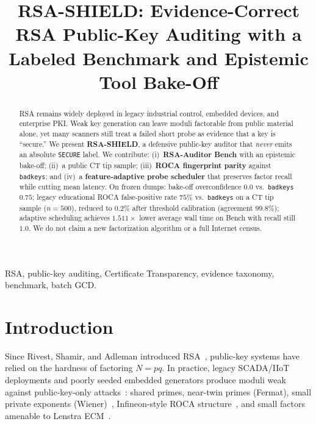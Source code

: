 \documentclass[conference]{IEEEtran}
\begin{document}
\title{RSA-SHIELD: Evidence-Correct RSA Public-Key Auditing with a Labeled Benchmark and Epistemic Tool Bake-Off}

\author{
}

\maketitle

\begin{abstract}
RSA remains widely deployed in legacy industrial control, embedded devices, and enterprise PKI. Weak key generation can leave moduli factorable from public material alone, yet many scanners still treat a failed short probe as evidence that a key is ``secure.'' We present \textbf{RSA-SHIELD}, a defensive public-key auditor that \emph{never} emits an absolute \texttt{SECURE} label. We contribute: (i)~\textbf{RSA-Auditor Bench} with an epistemic bake-off; (ii)~a public CT tip sample; (iii)~\textbf{ROCA fingerprint parity} against \texttt{badkeys}; and (iv)~a \textbf{feature-adaptive probe scheduler} that preserves factor recall while cutting mean latency. On frozen dumps: bake-off overconfidence $0.0$ vs.\ \texttt{badkeys} $0.75$; legacy educational ROCA false-positive rate $75\%$ vs.\ \texttt{badkeys} on a CT tip sample ($n{=}500$), reduced to $0.2\%$ after threshold calibration (agreement $99.8\%$); adaptive scheduling achieves $1.511\times$ lower average wall time on Bench with recall still $1.0$. We do not claim a new factorization algorithm or a full Internet census.
\end{abstract}

\begin{IEEEkeywords}
RSA, public-key auditing, Certificate Transparency, evidence taxonomy, benchmark, batch GCD.
\end{IEEEkeywords}

\section{Introduction}
Since Rivest, Shamir, and Adleman introduced RSA~\cite{rivest1978method}, public-key systems have relied on the hardness of factoring $N{=}pq$. In practice, legacy SCADA/IIoT deployments and poorly seeded embedded generators produce moduli weak against public-key-only attacks~\cite{heninger2012mining,hastings2016weak,lenstra2012ron}: shared primes, near-twin primes (Fermat), small private exponents (Wiener)~\cite{wiener1990cryptanalysis}, Infineon-style ROCA structure~\cite{nemec2017return}, and small factors amenable to Lenstra ECM~\cite{lenstra1987factoring}.
\end{document}
